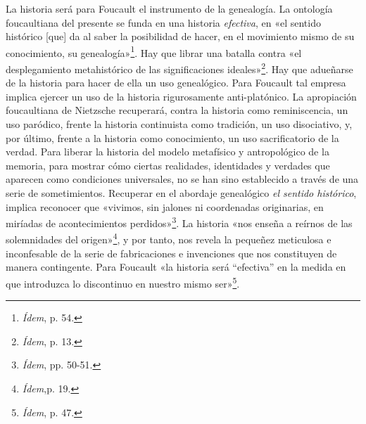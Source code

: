 La historia será para Foucault el instrumento de la genealogía. La ontología foucaultiana del presente se funda en una historia \emph{efectiva}, en «el sentido histórico {[}que{]} da al saber la posibilidad de hacer, en el movimiento mismo de su conocimiento, su genealogía»\footnote{\emph{Ídem}, p. 54.}. Hay que librar una batalla contra «el desplegamiento metahistórico de las significaciones ideales»\footnote{\emph{Ídem}, p. 13.}. Hay que adueñarse de la historia para hacer de ella un uso genealógico. Para Foucault tal empresa implica ejercer un uso de la historia rigurosamente anti-platónico. La apropiación foucaultiana de Nietzsche recuperará, contra la historia como reminiscencia, un uso paródico, frente la historia continuista como tradición, un uso disociativo, y, por último, frente a la historia como conocimiento, un uso sacrificatorio de la verdad. Para liberar la historia del modelo metafísico y antropológico de la memoria, para mostrar cómo ciertas realidades, identidades y verdades que aparecen como condiciones universales, no se han sino establecido a través de una serie de sometimientos. Recuperar en el abordaje genealógico \emph{el sentido histórico}, implica reconocer que «vivimos, sin jalones ni coordenadas originarias, en miríadas de acontecimientos perdidos»\footnote{\emph{Ídem}, pp. 50-51.}. La historia «nos enseña a reírnos de las solemnidades del origen»\footnote{\emph{Ídem},p. 19.}, y por tanto, nos revela la pequeñez meticulosa e inconfesable de la serie de fabricaciones e invenciones que nos constituyen de manera contingente. Para Foucault «la historia será ``efectiva'' en la medida en que introduzca lo discontinuo en nuestro mismo ser»\footnote{\emph{Ídem}, p. 47.}.

